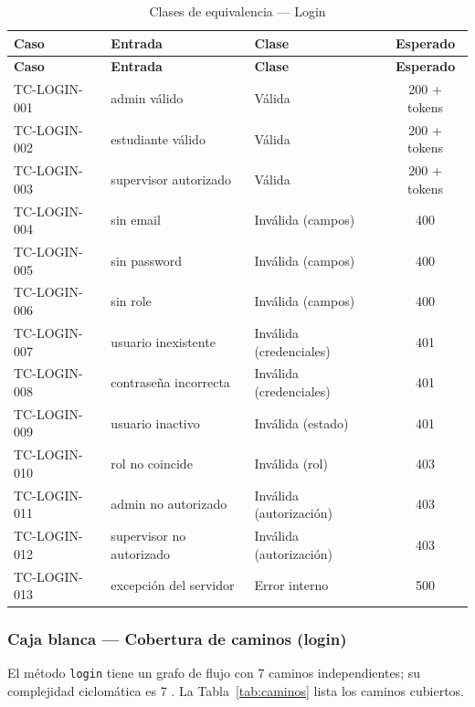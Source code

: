 \documentclass[stu,11pt,floatsintext]{apa7}
\begin{document}
\begin{longtable}{l L{0.42\textwidth} L{0.22\textwidth} c}
\caption{Clases de equivalencia — Login}\label{tab:login}\\
\toprule
\textbf{Caso} & \textbf{Entrada} & \textbf{Clase} & \textbf{Esperado} \\
\midrule
\endfirsthead
\toprule
\textbf{Caso} & \textbf{Entrada} & \textbf{Clase} & \textbf{Esperado} \\
\midrule
\endhead
\bottomrule
\endlastfoot
TC-LOGIN-001 & admin válido & Válida & 200 + tokens \\
TC-LOGIN-002 & estudiante válido & Válida & 200 + tokens \\
TC-LOGIN-003 & supervisor autorizado & Válida & 200 + tokens \\
TC-LOGIN-004 & sin email & Inválida (campos) & 400 \\
TC-LOGIN-005 & sin password & Inválida (campos) & 400 \\
TC-LOGIN-006 & sin role & Inválida (campos) & 400 \\
TC-LOGIN-007 & usuario inexistente & Inválida (credenciales) & 401 \\
TC-LOGIN-008 & contraseña incorrecta & Inválida (credenciales) & 401 \\
TC-LOGIN-009 & usuario inactivo & Inválida (estado) & 401 \\
TC-LOGIN-010 & rol no coincide & Inválida (rol) & 403 \\
TC-LOGIN-011 & admin no autorizado & Inválida (autorización) & 403 \\
TC-LOGIN-012 & supervisor no autorizado & Inválida (autorización) & 403 \\
TC-LOGIN-013 & excepción del servidor & Error interno & 500 \\
\end{longtable}

\subsubsection{Caja blanca — Cobertura de caminos (login)}
El método \texttt{login} tiene un grafo de flujo con 7 caminos independientes; su
complejidad ciclomática es 7 \parencite{mccabe1976}. La Tabla~\ref{tab:caminos} lista los
caminos cubiertos.
\end{document}
